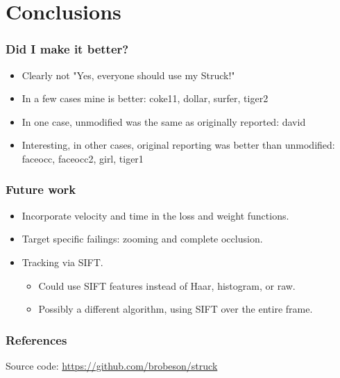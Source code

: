 \section{Conclusions}

\begin{frame}
    \frametitle{Did I make it better?}
    \begin{itemize}
        \item Clearly not "Yes, everyone should use my Struck!"
        \item In a few cases mine is better: coke11, dollar, surfer, tiger2
        \item In one case, unmodified was the same as originally reported: david
        \item Interesting, in other cases, original reporting was better than unmodified: faceocc, faceocc2, girl,
            tiger1
    \end{itemize}
\end{frame}

\begin{frame}
    \frametitle{Future work}
    \begin{itemize}
        \item Incorporate velocity and time in the loss and weight functions.
        \item Target specific failings: zooming and complete occlusion.
        \item Tracking via SIFT.
            \begin{itemize}
                \item Could use SIFT features instead of Haar, histogram, or raw.
                \item Possibly a different algorithm, using SIFT over the entire frame.
            \end{itemize}
    \end{itemize}
\end{frame}

\begin{frame}
    \frametitle{References}
    \nocite{*}
    
    

    Source code: \url{https://github.com/brobeson/struck}
\end{frame}
